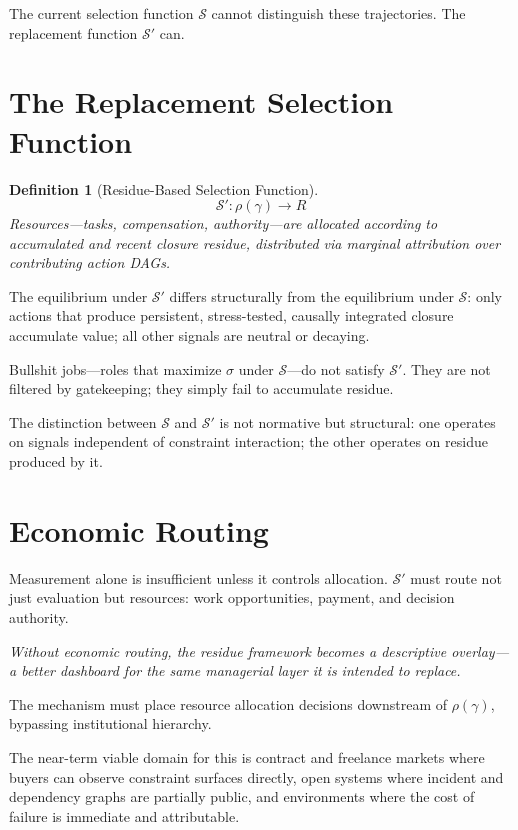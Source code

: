 \documentclass[12pt]{article}
\newtheorem{definition}{Definition}
\begin{document}
The current selection function $\mathcal{S}$ cannot distinguish these
trajectories. The replacement function $\mathcal{S}'$ can.

\section{The Replacement Selection Function}

\begin{definition}[Residue-Based Selection Function]
\[
  \mathcal{S}' : \rho(\gamma) \rightarrow R
\]
Resources---tasks, compensation, authority---are allocated according to
accumulated and recent closure residue, distributed via marginal
attribution over contributing action DAGs.
\end{definition}

The equilibrium under $\mathcal{S}'$ differs structurally from the
equilibrium under $\mathcal{S}$: only actions that produce persistent,
stress-tested, causally integrated closure accumulate value; all other
signals are neutral or decaying.

Bullshit jobs---roles that maximize $\sigma$ under $\mathcal{S}$---do
not satisfy $\mathcal{S}'$. They are not filtered by gatekeeping; they
simply fail to accumulate residue.

The distinction between $\mathcal{S}$ and $\mathcal{S}'$ is not
normative but structural: one operates on signals independent of
constraint interaction; the other operates on residue produced by it.

\section{Economic Routing}

Measurement alone is insufficient unless it controls allocation.
$\mathcal{S}'$ must route not just evaluation but resources: work
opportunities, payment, and decision authority.

\medskip
\noindent\textit{Without economic routing, the residue framework becomes
a descriptive overlay---a better dashboard for the same managerial layer
it is intended to replace.}
\medskip

The mechanism must place resource allocation decisions downstream of
$\rho(\gamma)$, bypassing institutional hierarchy.

The near-term viable domain for this is contract and freelance markets
where buyers can observe constraint surfaces directly, open systems
where incident and dependency graphs are partially public, and
environments where the cost of failure is immediate and attributable.
\end{document}
